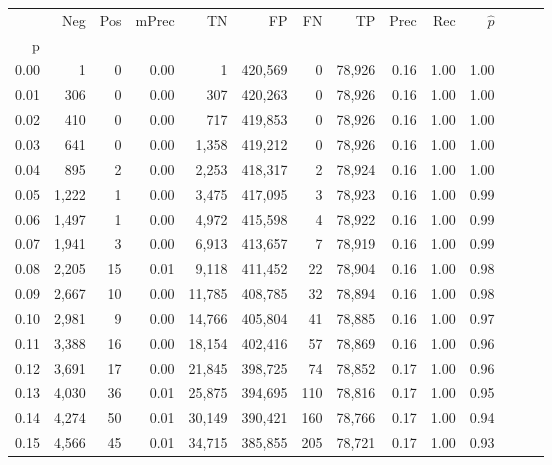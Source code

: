 \begin{tabular}{rrrrrrrrrrrrrr}
\toprule
{} &    Neg &    Pos & mPrec &       TN &       FP &      FN &      TP &  Prec &   Rec & $\hat{p}$ \\
p    &        &        &       &          &          &         &         &       &       &           \\
\midrule
0.00 &      1 &      0 &  0.00 &        1 &  420,569 &       0 &  78,926 &  0.16 &  1.00 &      1.00 \\
0.01 &    306 &      0 &  0.00 &      307 &  420,263 &       0 &  78,926 &  0.16 &  1.00 &      1.00 \\
0.02 &    410 &      0 &  0.00 &      717 &  419,853 &       0 &  78,926 &  0.16 &  1.00 &      1.00 \\
0.03 &    641 &      0 &  0.00 &    1,358 &  419,212 &       0 &  78,926 &  0.16 &  1.00 &      1.00 \\
0.04 &    895 &      2 &  0.00 &    2,253 &  418,317 &       2 &  78,924 &  0.16 &  1.00 &      1.00 \\
0.05 &  1,222 &      1 &  0.00 &    3,475 &  417,095 &       3 &  78,923 &  0.16 &  1.00 &      0.99 \\
0.06 &  1,497 &      1 &  0.00 &    4,972 &  415,598 &       4 &  78,922 &  0.16 &  1.00 &      0.99 \\
0.07 &  1,941 &      3 &  0.00 &    6,913 &  413,657 &       7 &  78,919 &  0.16 &  1.00 &      0.99 \\
0.08 &  2,205 &     15 &  0.01 &    9,118 &  411,452 &      22 &  78,904 &  0.16 &  1.00 &      0.98 \\
0.09 &  2,667 &     10 &  0.00 &   11,785 &  408,785 &      32 &  78,894 &  0.16 &  1.00 &      0.98 \\
0.10 &  2,981 &      9 &  0.00 &   14,766 &  405,804 &      41 &  78,885 &  0.16 &  1.00 &      0.97 \\
0.11 &  3,388 &     16 &  0.00 &   18,154 &  402,416 &      57 &  78,869 &  0.16 &  1.00 &      0.96 \\
0.12 &  3,691 &     17 &  0.00 &   21,845 &  398,725 &      74 &  78,852 &  0.17 &  1.00 &      0.96 \\
0.13 &  4,030 &     36 &  0.01 &   25,875 &  394,695 &     110 &  78,816 &  0.17 &  1.00 &      0.95 \\
0.14 &  4,274 &     50 &  0.01 &   30,149 &  390,421 &     160 &  78,766 &  0.17 &  1.00 &      0.94 \\
0.15 &  4,566 &     45 &  0.01 &   34,715 &  385,855 &     205 &  78,721 &  0.17 &  1.00 &      0.93 \\

\end{tabular}
